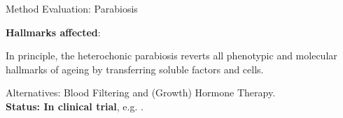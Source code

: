 \begin{frame}[c]{Method Evaluation: Parabiosis}
    \large



    \textbf{Hallmarks affected}:
    \begin{aquote}{\cite{conese2017fountain}}
        In principle, the heterochonic parabiosis reverts all phenotypic and molecular hallmarks of ageing by transferring soluble factors and cells.
    \end{aquote}

    \pause
    Alternatives: Blood Filtering and (Growth) Hormone Therapy. \\
    \pause
    \textbf{Status: In clinical trial}, e.g. \cite{AStudyto73:online}.
\end{frame}

